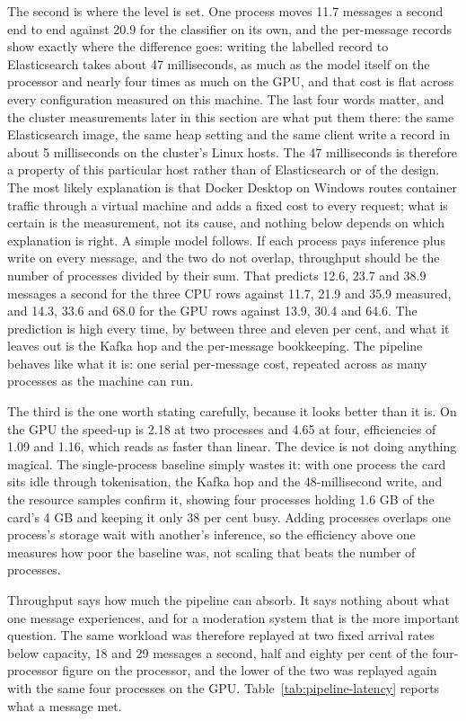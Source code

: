 The second is where the level is set. One process moves 11.7 messages a second end to end against 20.9 for the classifier on its own, and the per-message records show exactly where the difference goes: writing the labelled record to Elasticsearch takes about 47 milliseconds, as much as the model itself on the processor and nearly four times as much on the GPU, and that cost is flat across every configuration measured on this machine. The last four words matter, and the cluster measurements later in this section are what put them there: the same Elasticsearch image, the same heap setting and the same client write a record in about 5 milliseconds on the cluster's Linux hosts. The 47 milliseconds is therefore a property of this particular host rather than of Elasticsearch or of the design. The most likely explanation is that Docker Desktop on Windows routes container traffic through a virtual machine and adds a fixed cost to every request; what is certain is the measurement, not its cause, and nothing below depends on which explanation is right. A simple model follows. If each process pays inference plus write on every message, and the two do not overlap, throughput should be the number of processes divided by their sum. That predicts 12.6, 23.7 and 38.9 messages a second for the three CPU rows against 11.7, 21.9 and 35.9 measured, and 14.3, 33.6 and 68.0 for the GPU rows against 13.9, 30.4 and 64.6. The prediction is high every time, by between three and eleven per cent, and what it leaves out is the Kafka hop and the per-message bookkeeping. The pipeline behaves like what it is: one serial per-message cost, repeated across as many processes as the machine can run.

The third is the one worth stating carefully, because it looks better than it is. On the GPU the speed-up is 2.18 at two processes and 4.65 at four, efficiencies of 1.09 and 1.16, which reads as faster than linear. The device is not doing anything magical. The single-process baseline simply wastes it: with one process the card sits idle through tokenisation, the Kafka hop and the 48-millisecond write, and the resource samples confirm it, showing four processes holding 1.6 GB of the card's 4 GB and keeping it only 38 per cent busy. Adding processes overlaps one process's storage wait with another's inference, so the efficiency above one measures how poor the baseline was, not scaling that beats the number of processes.

Throughput says how much the pipeline can absorb. It says nothing about what one message experiences, and for a moderation system that is the more important question. The same workload was therefore replayed at two fixed arrival rates below capacity, 18 and 29 messages a second, half and eighty per cent of the four-processor figure on the processor, and the lower of the two was replayed again with the same four processes on the GPU. Table~\ref{tab:pipeline-latency} reports what a message met.

